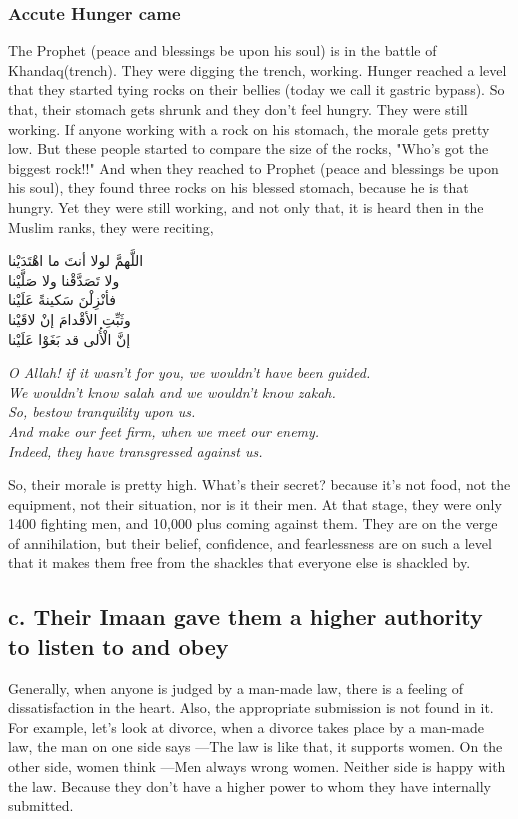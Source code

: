 {\subsubsection*{Accute Hunger came}
The Prophet (peace and blessings be upon his soul) is in the battle of Khandaq(trench). They were digging the trench, working. Hunger reached a level that they started tying rocks on their bellies (today we call it gastric bypass). So that, their stomach gets shrunk and they don't feel hungry. They were still working. If anyone working with a rock on his stomach, the morale gets pretty low. But these people started to compare the size of the rocks, "Who's got the biggest rock!!" And when they reached to Prophet (peace and blessings be upon his soul), they found three rocks on his blessed stomach, because he is that hungry. Yet they were still working, and not only that, it is heard then in the Muslim ranks, they were reciting,
\begin{center}
    \begin{RLtext}
        اللَّهمَّ لولا أنتَ ما اهْتَدَيْنا\\
        ولا تَصَدَّقْنا ولا صَلَّيْنا\\
        فأنْزِلْنَ سَكينةً عَلَيْنا\\
        وثَبِّتِ الأقْدامَ إنْ لاقَيْنا\\
        إنَّ الْأُلى قد بَغَوْا عَلَيْنا\\
    \end{RLtext}
    \textit{O Allah! if it wasn't for you, we wouldn't have been guided.\\
    We wouldn't know salah and we wouldn't know zakah.\\
    So, bestow tranquility upon us.\\
    And make our feet firm, when we meet our enemy.\\
    Indeed, they have transgressed against us.
    }
\end{center}
So, their morale is pretty high. What's their secret? because it's not food, not the equipment, not their situation, nor is it their men. At that stage, they were only 1400 fighting men, and 10,000 plus coming against them. They are on the verge of annihilation, but their belief, confidence, and fearlessness are on such a level that it makes them free from the shackles that everyone else is shackled by.

\subsection*{c. Their Imaan gave them a higher authority to listen to and obey}
Generally, when anyone is judged by a man-made law, there is a feeling of dissatisfaction in the heart. Also, the appropriate submission is not found in it. For example, let's look at divorce, when a divorce takes place by a man-made law, the man on one side says ---The law is like that, it supports women. On the other side, women think ---Men always wrong women. Neither side is happy with the law. Because they don't have a higher power to whom they have internally submitted. 

}
